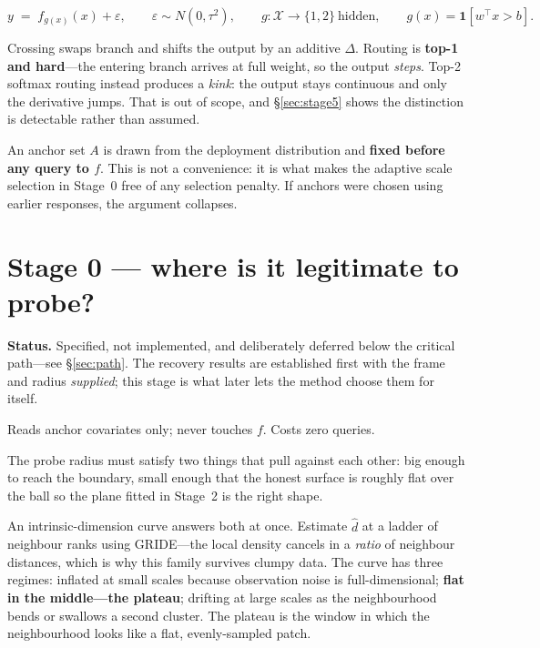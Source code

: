\documentclass[11pt]{article}
\newcommand{\Ind}{\mathbf{1}}
\begin{document}
\[
  y \;=\; f_{g(x)}(x) + \varepsilon, \qquad \varepsilon \sim N(0,\tau^2),
  \qquad g:\mathcal{X}\to\{1,2\} \ \text{hidden}, \qquad g(x)=\Ind[w^\top x > b].
\]

Crossing swaps branch and shifts the output by an additive $\Delta$. Routing is \textbf{top-1 and
hard}---the entering branch arrives at full weight, so the output \emph{steps}. Top-2 softmax
routing instead produces a \emph{kink}: the output stays continuous and only the derivative jumps.
That is out of scope, and \S\ref{sec:stage5} shows the distinction is detectable rather than
assumed.

An anchor set $A$ is drawn from the deployment distribution and \textbf{fixed before any query to
$f$}. This is not a convenience: it is what makes the adaptive scale selection in Stage~0 free of
any selection penalty. If anchors were chosen using earlier responses, the argument collapses.

\section{Stage 0 --- where is it legitimate to probe?}
\label{sec:stage0}

\begin{notebox}
\textbf{\sffamily Status.} Specified, not implemented, and deliberately deferred below the
critical path---see \S\ref{sec:path}. The recovery results are established first with the frame
and radius \emph{supplied}; this stage is what later lets the method choose them for itself.
\end{notebox}

\smallskip
\noindent Reads anchor covariates only; never touches $f$. Costs zero queries.

The probe radius must satisfy two things that pull against each other: big enough to reach the
boundary, small enough that the honest surface is roughly flat over the ball so the plane fitted
in Stage~2 is the right shape.

An intrinsic-dimension curve answers both at once. Estimate $\hat d$ at a ladder of neighbour
ranks using GRIDE---the local density cancels in a \emph{ratio} of neighbour distances, which is
why this family survives clumpy data. The curve has three regimes: inflated at small scales
because observation noise is full-dimensional; \textbf{flat in the middle---the plateau};
drifting at large scales as the neighbourhood bends or swallows a second cluster. The plateau is
the window in which the neighbourhood looks like a flat, evenly-sampled patch.
\end{document}

